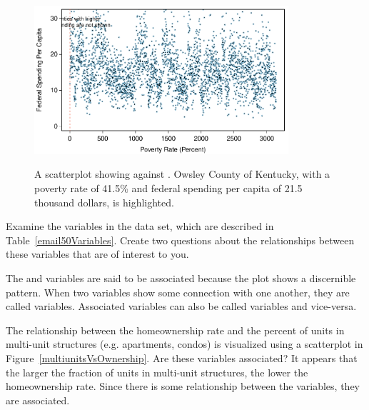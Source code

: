 \begin{figure}
\centering
 \href{\oiRedirectUrl{tableau_scatter_fed_spending}}{\includegraphics[width=0.84\textwidth]{ch_data_collection/figures/county_fed_spendVsPoverty/county_fed_spendVsPoverty}}
\caption{A scatterplot showing  against . Owsley County of Kentucky, with a poverty rate of 41.5\% and federal spending per capita of 21.5 thousand dollars, is highlighted.}
\label{county_fed_spendVsPoverty}%
\end{figure}

\begin{exercisewrap}
\begin{nexercise}
Examine the variables in the  data set, which are described in Table~\vref{email50Variables}. Create two questions about the relationships between these variables that are of interest to you.\footnotemark
\end{nexercise}
\end{exercisewrap}

The  and  variables are said to be associated because the plot shows a discernible pattern. When two variables show some connection with one another, they are called  variables. Associated variables can also be called  variables and vice-versa.

\begin{examplewrap}
\begin{nexample}{The relationship between the homeownership rate and the percent of units in multi-unit structures (e.g. apartments, condos) is visualized using a scatterplot in Figure~\ref{multiunitsVsOwnership}. Are these variables associated?}
It appears that the larger the fraction of units in multi-unit structures, the lower the homeownership rate. Since there is some relationship between the variables, they are associated.
\end{nexample}
\end{examplewrap}


